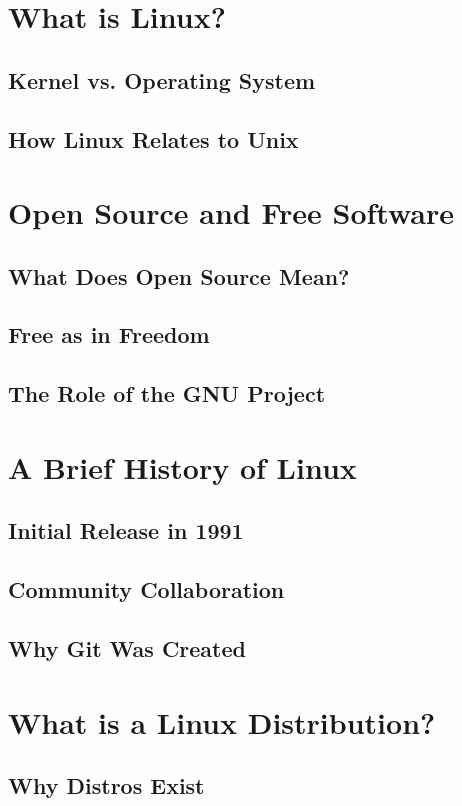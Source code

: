     \section{What is Linux?}
    \subsection{Kernel vs. Operating System}
    \subsection{How Linux Relates to Unix}
    
    \section{Open Source and Free Software}
    \subsection{What Does Open Source Mean?}
    \subsection{Free as in Freedom}
    \subsection{The Role of the GNU Project}
    
    \section{A Brief History of Linux}
    \subsection{Initial Release in 1991}
    \subsection{Community Collaboration}
    \subsection{Why Git Was Created}
    
    \section{What is a Linux Distribution?}
    \subsection{Why Distros Exist}
